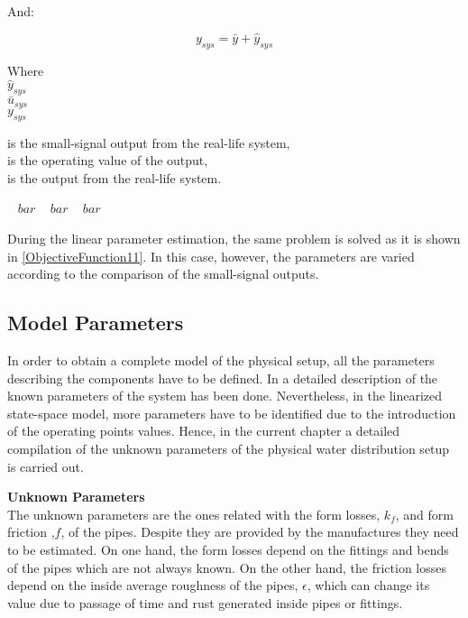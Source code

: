 And:

\begin{equation}
  y_{sys} = \bar{y} + \hat{y}_{sys} 
 \label{u_smallsignal}
\end{equation}

\begin{minipage}[t]{0.20\textwidth}
Where\\
\hspace*{8mm} $\hat{y}_{sys}$ \\
\hspace*{8mm} $\bar{u}_{sys}$ \\
\hspace*{8mm} $y_{sys}$ 
\end{minipage}
\begin{minipage}[t]{0.68\textwidth}
\vspace*{2mm}
is the small-signal output from the real-life system, \\
is the operating value of the output,\\
is the output from the real-life system. 
\end{minipage}
\begin{minipage}[t]{0.10\textwidth}
\vspace*{2mm}
\textcolor{White}{te}$\unit{bar}$
\textcolor{White}{te}$\unit{bar}$
\textcolor{White}{te}$\unit{bar}$
\end{minipage} 

During the linear parameter estimation, the same problem is solved as it is shown in \eqref{ObjectiveFunction11}. In this case, however, the parameters are varied according to the comparison of the small-signal outputs.  

\subsection{Model Parameters}
\label{estimateParameters}
In order to obtain a complete model of the physical setup, all the parameters describing the components have to be defined. In  a detailed
description of the known parameters of the system has been done. Nevertheless, in the linearized state-space model, more parameters have to be identified
due to the introduction of the operating points values. Hence, in the current chapter a detailed compilation of the unknown parameters of the physical water distribution setup is carried out.


\textbf{Unknown Parameters}\\
The unknown parameters are the ones related with the form losses, $k_f$, and form friction ,$f$, of the pipes. Despite they are 
provided by the manufactures they need to be estimated. On one hand, the form losses depend on the fittings and bends of the pipes which are not always known. 
On the other hand, the friction losses depend on the inside average roughness of the pipes, $\epsilon$, which can change its value due to passage of time 
and rust generated inside pipes or fittings. 


